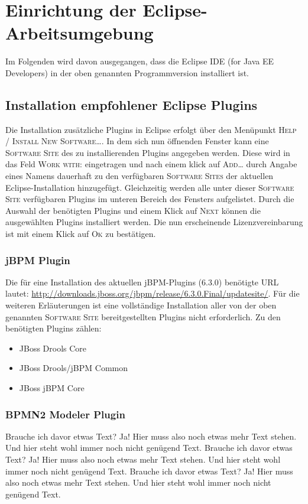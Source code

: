 \section{Einrichtung der Eclipse-Arbeitsumgebung}
Im Folgenden wird davon ausgegangen, dass die Eclipse IDE (for Java EE Developers) in der oben genannten Programmversion installiert ist.

\subsection{Installation empfohlener Eclipse Plugins}
Die Installation zusätzliche Plugins in Eclipse erfolgt über den Menüpunkt \textsc{Help / Install New Software\ldots}. In dem sich nun öffnenden Fenster kann eine \textsc{Software Site} des zu installierenden Plugins angegeben werden. Diese wird in das Feld \textsc{Work with:} eingetragen und nach einem klick auf \textsc{Add\ldots} durch Angabe eines Namens dauerhaft zu den verfügbaren \textsc{Software Sites} der aktuellen Eclipse-Installation hinzugefügt. Gleichzeitig werden alle unter dieser \textsc{Software Site} verfügbaren Plugins im unteren Bereich des Fensters aufgelistet. Durch die Auswahl der benötigten Plugins und einem Klick auf \textsc{Next} können die ausgewählten Plugins installiert werden. Die nun erscheinende Lizenzvereinbarung ist mit einem Klick auf \textsc{Ok} zu bestätigen.

\subsubsection{jBPM Plugin}
Die für eine Installation des aktuellen jBPM-Plugins (6.3.0) benötigte URL lautet: \url{http://downloads.jboss.org/jbpm/release/6.3.0.Final/updatesite/}. Für die weiteren Erläuterungen ist eine vollständige Installation aller von der oben genannten \textsc{Software Site} bereitgestellten Plugins nicht erforderlich. Zu den benötigten Plugins zählen:
\begin{itemize}\renewcommand{\labelitemi}{\itemizecheck}
	\item JBoss Drools Core
	\item JBoss Drools/jBPM Common
	\item JBoss jBPM Core
\end{itemize}

\subsubsection{BPMN2 Modeler Plugin}
Brauche ich davor etwas Text? Ja! Hier muss also noch etwas mehr Text stehen. Und hier steht wohl immer noch nicht genügend Text. Brauche ich davor etwas Text? Ja! Hier muss also noch etwas mehr Text stehen. Und hier steht wohl immer noch nicht genügend Text. Brauche ich davor etwas Text? Ja! Hier muss also noch etwas mehr Text stehen. Und hier steht wohl immer noch nicht genügend Text.


